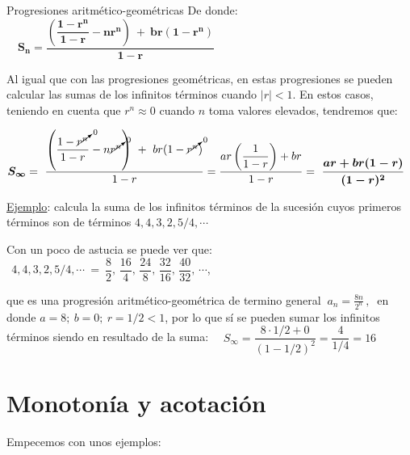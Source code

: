 \begin{myalertblock}{Progresiones aritmético-geométricas}
\vspace{2mm} De donde: $\quad \boldsymbol{S_n= \dfrac{
\left( \dfrac{1-r^n}{1-r}-nr^n \right) \ + \ br(1-r^n)
}{1-r}}$

\vspace{2mm} Al igual que con las progresiones geométricas, en estas progresiones se pueden calcular las sumas de los infinitos términos cuando $|r| <1$. En estos casos, teniendo en cuenta que $r^n \approx 0$  cuando $n$ toma valores elevados, tendremos que:

\vspace{2mm}  $\boldsymbol{S_\infty}= \ \dfrac{
\left( \dfrac{1-\cancelto{0}{r^n}}{1-r}-n \cancelto{0}{r^n} \right) \ + \ br(1-\cancelto{0}{r^n})
}{1-r} =\dfrac{ar\left( \dfrac 1{1-r} \right) +br}{1-r} = \ \boldsymbol{\dfrac{ar+br(1-r)}{(1-r)^2}}$
 
 
\vspace{5mm} \underline{Ejemplo}:  calcula la suma de los infinitos términos de la sucesión cuyos primeros términos son de términos $4, 4, 3, 2, 5/4 , \cdots $

\vspace{2mm} Con un poco de astucia se puede ver que: $\ \ 4, 4, 3, 2, 5/4 , \cdots \ = \ \dfrac{8}{2},\, \dfrac{16}{4},\, \dfrac{24}{8},\, \dfrac{32}{16},\, \dfrac{40}{32},\, \cdots$, 

que es una progresión aritmético-geométrica de termino general $\ a_n=\frac{8n}{2^n} \, , \  $ en donde $ a=8;\ b=0;\ r=1/2<1$, por lo que sí se pueden sumar los infinitos términos siendo en resultado de la suma:
$\quad S_\infty= \dfrac{8\cdot 1/2 + 0}{(1-1/2)^2}=\dfrac{4}{1/4}=16$


\end{myalertblock}


\vspace{1cm}
\section{Monotonía y acotación}
\vspace{0.5cm}


Empecemos con unos ejemplos:

